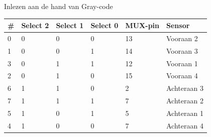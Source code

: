 \documentclass[t,12pt,english
\ifx\beamermode\undefined\else,\beamermode\fi
]{beamer}
\begin{document}
\begin{frame}{Inlezen aan de hand van Gray-code}
\begin{table}[H]
	\centering
	\renewcommand{\arraystretch}{1}
	\begin{tabular}{|l|l|l|l|l|l|}
		\hline
		\# & Select 2 & Select 1 & Select 0 & MUX-pin & Sensor      \\ \hline
		0  & 0            & 0            & 0            & 13      & Vooraan 2   \\ \hline
		1  & 0            & 0            & 1            & 14      & Vooraan 3   \\ \hline
		3  & 0            & 1            & 1            & 12      & Vooraan 1   \\ \hline
		2  & 0            & 1            & 0            & 15      & Vooraan 4   \\ \hline
		6  & 1            & 1            & 0            & 2       & Achteraan 3 \\ \hline
		7  & 1            & 1            & 1            & 7       & Achteraan 2 \\ \hline
		5  & 1            & 0            & 1            & 5       & Achteraan 1 \\ \hline
		4  & 1            & 0            & 0            & 7       & Achteraan 4 \\ \hline
	\end{tabular}
\end{table}
\end{frame}
\end{document}

